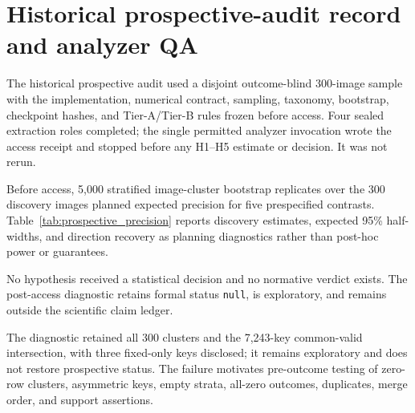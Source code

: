 \documentclass[preprint,10pt]{elsarticle}
\begin{document}
\section{Historical prospective-audit record and analyzer QA}

The historical prospective audit used a disjoint outcome-blind 300-image sample with the implementation, numerical contract, sampling, taxonomy, bootstrap, checkpoint hashes, and Tier-A/Tier-B rules frozen before access. Four sealed extraction roles completed; the single permitted analyzer invocation wrote the access receipt and stopped before any H1--H5 estimate or decision. It was not rerun.

Before access, 5,000 stratified image-cluster bootstrap replicates over the 300 discovery images planned expected precision for five prespecified contrasts. Table~\ref{tab:prospective_precision} reports discovery estimates, expected 95\% half-widths, and direction recovery as planning diagnostics rather than post-hoc power or guarantees.

\begin{table}[ht]
\centering
\caption{Prospective precision planning from the 300-image discovery sample. Expected half-width is half the percentile 95\% bootstrap interval. Direction recovery is the proportion of discovery bootstrap replicates matching the prespecified sign. No lockbox outcome was used.}
\label{tab:prospective_precision}

\end{table}

No hypothesis received a statistical decision and no normative verdict exists. The post-access diagnostic retains formal status \texttt{null}, is exploratory, and remains outside the scientific claim ledger.

\begin{table}[ht]
\centering
\caption{Post-access diagnostic contrasts retained for audit-trail completeness. These exploratory estimates are inadmissible as confirmatory evidence, excluded from the scientific claim ledger, and not preregistered verdicts.}

\end{table}

The diagnostic retained all 300 clusters and the 7,243-key common-valid intersection, with three fixed-only keys disclosed; it remains exploratory and does not restore prospective status. The failure motivates pre-outcome testing of zero-row clusters, asymmetric keys, empty strata, all-zero outcomes, duplicates, merge order, and support assertions.
\end{document}
